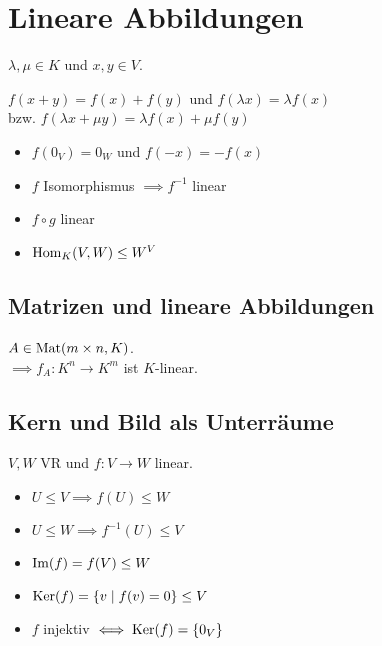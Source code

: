 \section*{Lineare Abbildungen}
$\lambda,\mu \in K$ und $x,y \in V$.

$f(x+y)=f(x)+f(y)$ und $f(\lambda x) = \lambda f(x)$ \\
bzw. $f(\lambda x + \mu y) = \lambda f(x) + \mu f (y)$

\begin{itemize}
	\item $f(0_V)=0_W$ und $f(-x) = -f(x)$
	\item $f$ Isomorphismus $\implies f^{-1}$ linear
	\item $f \circ g$ linear
	\item $\operatorname{Hom}_K(V,W) \le W^V$
\end{itemize}

\subsection*{Matrizen und lineare Abbildungen}
$A\in\operatorname{Mat}(m\times n, K)$.\\
$\implies f_A: K^n\to K^m$ ist $K$-linear.

\subsection*{Kern und Bild als Unterräume}
$V,W$ VR und $f:V\to W$ linear.
\begin{itemize}
	\item $U\le V \implies f(U)\le W$
	\item $U\le W \implies f^{-1}(U) \le V$
	\item $\operatorname{Im}(f)=f(V)\le W$
	\item $\operatorname{Ker}(f) = \{v \mid f(v)=0\} \le V$
	\item $f$ injektiv $\iff \operatorname{Ker}(f)=\{0_V\}$
\end{itemize}
